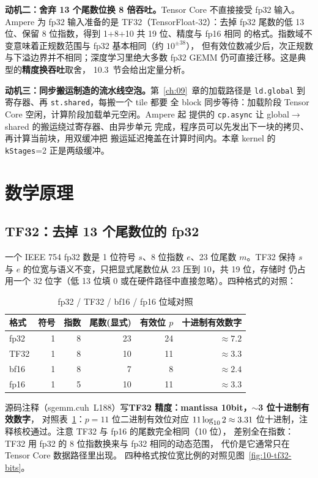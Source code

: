 \textbf{动机二：舍弃 13 个尾数位换 8 倍吞吐。}\allowbreak{}Tensor Core 不直接接受
fp32 输入。Ampere 为 fp32 输入准备的是 TF32（TensorFloat-32）：去掉
fp32 尾数的低 13 位、保留 8 位指数，得到 1+8+10 共 19 位、精度与 fp16 相同
的格式。指数域不变意味着正规数范围与 fp32 基本相同（约 $10^{\pm38}$），
但有效位数减少后，次正规数与下溢边界并不相同；深度学习里绝大多数 fp32 GEMM 仍可直接迁移。这是典型的\textbf{精度换吞吐}取舍，
10.3~节会给出定量分析。

\textbf{动机三：同步搬运制造的流水线空泡。}第~\ref{ch:09}~章的加载路径是
\texttt{ld.global} 到寄存器、再 \texttt{st.shared}，每搬一个 tile 都要
全 block 同步等待：加载阶段 Tensor Core 空闲，计算阶段加载单元空闲。Ampere 起
提供的 \texttt{cp.async} 让 global$\to$shared 的搬运绕过寄存器、由异步单元
完成，程序员可以先发出下一块的拷贝、再计算当前块，用双缓冲把
搬运延迟掩盖在计算时间内。本章 kernel 的 \texttt{kStages}=2 正是两级缓冲。

\section{数学原理}

\subsection{TF32：去掉 13 个尾数位的 fp32}

一个 IEEE 754 fp32 数是 1 位符号 $s$、8 位指数 $e$、23 位尾数 $m$。TF32 保持
$s$ 与 $e$ 的位宽与语义不变，只把显式尾数位从 23 压到 10，共 19 位，存储时
仍占用一个 32 位字（低 13 位填 0 或在硬件路径中直接忽略）。四种格式的对照：
\begin{table}[htbp]
\centering
\caption{fp32 / TF32 / bf16 / fp16 位域对照}
\label{tab:10-fmt}
\begin{tabular}{lrrrrr}
\toprule
格式 & 符号 & 指数 & 尾数(显式) & 有效位 $p$ & 十进制有效数字 \\
\midrule
fp32 & 1 & 8 & 23 & 24 & $\approx 7.2$ \\
TF32 & 1 & 8 & 10 & 11 & $\approx 3.3$ \\
bf16 & 1 & 8 & 7  & 8  & $\approx 2.4$ \\
fp16 & 1 & 5 & 10 & 11 & $\approx 3.3$ \\
\bottomrule
\end{tabular}
\end{table}
源码注释（sgemm.cuh~L188）写\textbf{TF32 精度：mantissa 10bit，$\sim$3 位十进制有效数字}，
对照表~\ref{tab:10-fmt}：$p=11$ 位二进制有效位对应 $11 \log\sb {10} 2 \approx 3.31$
位十进制，注释核校通过。注意 TF32 与 fp16 的尾数完全相同（10 位），
差别全在指数：TF32 用 fp32 的 8 位指数换来与 fp32 相同的动态范围，
代价是它通常只在 Tensor Core 数据路径里出现。
四种格式按位宽比例的对照见图~\ref{fig:10-tf32-bits}。

